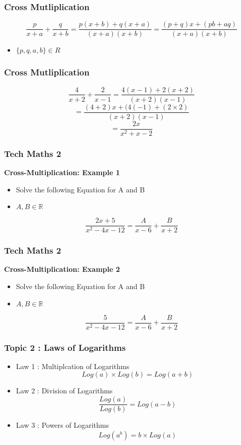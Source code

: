 \documentclass{beamer}
\begin{document}
\begin{frame}
	\frametitle{Cross Mutliplication}
	\Large
	\[  \frac{p}{x+a} + \frac{q}{x+b}   = \frac{p(x+b) + q(x+a)}{(x+a)(x+b)} = \frac{(p+q)x+ (pb+aq)}{(x+a)(x+b)} \]
	
	\begin{itemize}
		\item $\{p,q,a,b\} \in R$
	\end{itemize}
	
\end{frame}
\begin{frame}
	\frametitle{Cross Mutliplication}
	\Large
	\[  \frac{4}{x+2} + \frac{2}{x-1}   = \frac{4(x-1) + 2(x+2)}{(x+2)(x-1)} \]
	\[ = \frac{(4+2)x + (4(-1)+(2\times 2)}{(x+2)(x-1)} \]
	\[ = \frac{2x}{x^2+x-2}\]
	
\end{frame}
\begin{frame}
	\frametitle{Tech Maths 2}
	\textbf{Cross-Multiplication: Example 1}
	\begin{itemize}
		\item Solve the following Equation for A and B
		\item $A,B \in \mathbb{R}$
	\end{itemize}
	
	\[ \frac{2x + 5}{x^2 - 4x - 12} = \frac{A}{x-6} + \frac{B}{x+2}\]
\end{frame}
\begin{frame}
	\frametitle{Tech Maths 2}
	\textbf{Cross-Multiplication: Example 2}
	\begin{itemize}
		\item Solve the following Equation for A and B
		\item $A,B \in \mathbb{R}$
	\end{itemize}
	
	\[ \frac{5}{x^2 - 4x - 12} = \frac{A}{x-6} + \frac{B}{x+2}\]
\end{frame}









\begin{frame}
	\frametitle{ Topic 2 : Laws of Logarithms}
	\Large
	\begin{itemize}
		\item Law 1 : Multiplcation of Logarithms
		\[ Log(a) \times Log(b) = Log(a+b) \]
		\item Law 2 : Division of Logarithms
		\[ \frac{Log(a)}{Log(b)} = Log(a-b) \]
		\item Law 3 : Powers of Logarithms
		\[ Log(a^b) = b \times Log(a) \]
	\end{itemize}
	
	
	
\end{frame}
\end{document}
